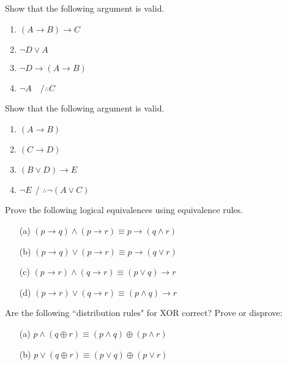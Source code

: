 \documentclass[11pt, oneside]{article}
\begin{document}
\begin{question}Show that the following argument is valid.
	\begin{enumerate}
		\item $(A\rightarrow B)\rightarrow C$
		\item $\neg D\vee A$
		\item $\neg D \rightarrow (A\rightarrow B)$
		\item $\neg A$~~$/ \therefore C$
	\end{enumerate}
\end{question}

\begin{question}Show that the following argument is valid.
	\begin{enumerate}
		\item $(A\rightarrow B)$
		\item $(C\rightarrow D)$
		\item $(B\vee D)\rightarrow E$
		\item $\neg E~~$/ $\therefore \neg(A\vee C)$
	\end{enumerate}
\end{question}
\begin{question}
	Prove the following logical equivalences using equivalence rules.
	\begin{enumerate}
		\item[(a)] $(p\rightarrow q)\wedge(p\rightarrow r)\equiv p\rightarrow(q\wedge r)$
		\item[(b)] $(p\rightarrow q)\vee(p\rightarrow r)\equiv p\rightarrow(q\vee r)$
		\item[(c)] $(p\rightarrow r)\wedge(q\rightarrow r)\equiv (p\vee q)\rightarrow r$
		\item[(d)] $(p\rightarrow r)\vee(q\rightarrow r)\equiv (p\wedge q)\rightarrow r$
	\end{enumerate}
\end{question}

\begin{question}
	Are the following ``distribution rules" for XOR correct?	Prove or disprove:
	\begin{enumerate}
		\item[(a)] $p\wedge(q\oplus r)\equiv(p\wedge q)\oplus(p\wedge r)$
		\item[(b)] $p\vee(q\oplus r)\equiv(p\vee q)\oplus(p\vee r)$
	\end{enumerate}
\end{question}

\end{document}
